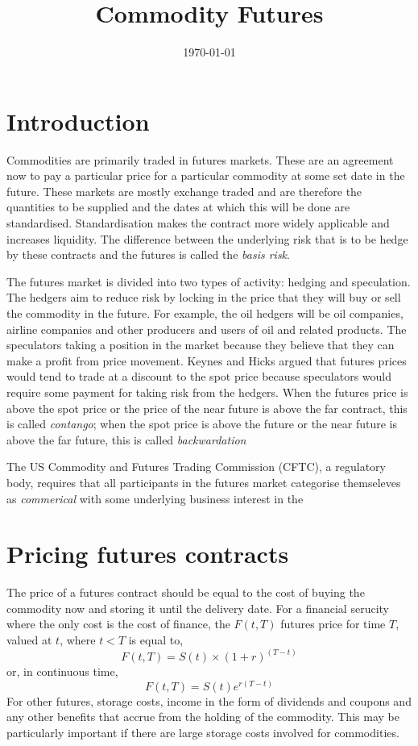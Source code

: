 \documentclass[12pt, a4paper, oneside]{article}\usepackage[]{graphicx}\usepackage[]{color}
\begin{document}
\title{Commodity Futures}
\date{\today}
\maketitle
\section*{Introduction}
Commodities are primarily traded in futures markets.  These are an agreement now to pay a particular price for a particular commodity at some set date in the future. These markets are mostly exchange traded and are therefore the quantities to be supplied and the dates at which this will be done are standardised.  Standardisation makes the contract more widely applicable and increases liquidity.  The difference between the underlying risk that is to be hedge by these contracts and the futures is called the \emph{basis risk}.  

The futures market is divided into two types of activity:  hedging and speculation.  The hedgers aim to reduce risk by locking in the price that they will buy or sell the commodity in the future.  For example, the oil hedgers will be oil companies, airline companies and other producers and users of oil and related products. The speculators taking a position in the market because they believe that they can make a profit from price movement.  Keynes and Hicks argued that futures prices would tend to trade at a discount to the spot price because speculators would require some payment for taking risk from the hedgers. When the futures price is above the spot price or the price of the near future is above the far contract, this is called \emph{contango}; when the spot price is above the future or the near future is above the far future, this is called \emph{backwardation}

The US Commodity and Futures Trading Commission (CFTC), a regulatory body, requires that all participants in the futures market categorise themseleves as \emph{commerical} with some underlying business interest in the 

\section*{Pricing futures contracts}
The price of a futures contract should be equal to the cost of buying the commodity now and storing it until the delivery date.  For a financial serucity where the only cost is the cost of finance, the $F(t, T)$ futures price for time $T$, valued at $t$, where $t<T$ is equal to, 
\begin{equation*}
F(t, T) = S(t) \times (1 +r)^{(T-t)}
\end{equation*}
or, in continuous time, 
\begin{equation*}
F(t, T) = S(t)e^{r(T-t)}
\end{equation*}
For other futures, storage costs, income in the form of dividends and coupons and any other benefits that accrue from the holding of the commodity. This may be particularly important if there are large storage costs involved for commodities.
\end{document}
